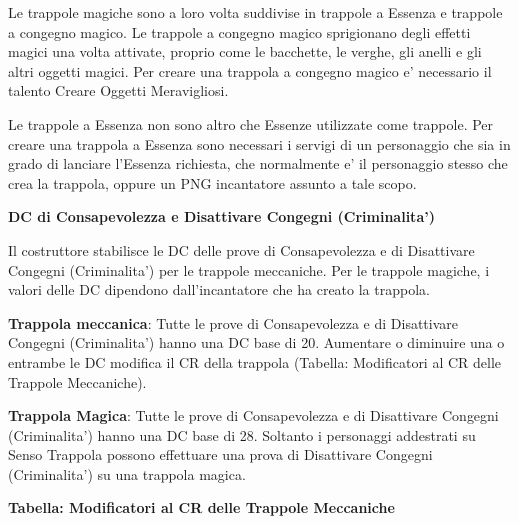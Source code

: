 \documentclass[a4paper,11pt,twoside,openany]{book}
\begin{document}
{Le trappole magiche sono a loro volta suddivise in trappole a Essenza e trappole a congegno magico. Le trappole a congegno magico sprigionano degli effetti magici una volta attivate, proprio come le bacchette, le verghe, gli anelli e gli altri oggetti magici. Per creare una trappola a congegno magico e' necessario il talento Creare Oggetti Meravigliosi. 

Le trappole a Essenza non sono altro che Essenze utilizzate come trappole. Per creare una trappola a Essenza sono necessari i servigi di un personaggio che sia in grado di lanciare l'Essenza richiesta, che normalmente e' il personaggio stesso che crea la trappola, oppure un PNG incantatore assunto a tale scopo.

\textbf{DC di Consapevolezza e Disattivare Congegni (Criminalita')}

Il costruttore stabilisce le DC delle prove di Consapevolezza e di Disattivare Congegni (Criminalita') per le trappole meccaniche. Per le trappole magiche, i valori delle DC dipendono dall'incantatore che ha creato la trappola.

\textbf{Trappola meccanica}: Tutte le prove di Consapevolezza e di Disattivare Congegni (Criminalita') hanno una DC base di 20. Aumentare o diminuire una o entrambe le DC modifica il CR della trappola (Tabella: Modificatori al CR delle Trappole Meccaniche). 

\textbf{Trappola Magica}: Tutte le prove di Consapevolezza e di Disattivare Congegni (Criminalita') hanno una DC base di 28. Soltanto i personaggi addestrati su Senso Trappola possono effettuare una prova di Disattivare Congegni (Criminalita') su una trappola magica.

\pagebreak

\textbf{Tabella: Modificatori al CR delle Trappole Meccaniche}


}
\end{document}

